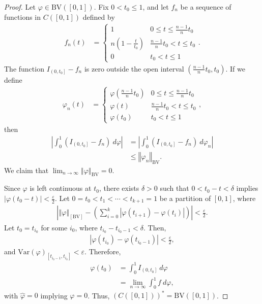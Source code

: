 \documentclass[10pt]{extarticle}
\newcommand{\norm}[1]{\left\Vert #1\right\Vert}
\newcommand{\ve}{\varepsilon}
\theoremstyle{plain}
\theoremstyle{definition}
\theoremstyle{note}
\renewcommand{\newline}{\hfill\break}
\begin{document}
\begin{proof}
  Let $\varphi \in \text{BV}\left([0,1]\right)$. Fix $0 < t_0 \leq 1$, and let $f_n$ be a sequence of functions in $C\left([0,1]\right)$ defined by
  \begin{align*}
    f_n\left(t\right) &= \begin{cases}
      1 & 0 \leq t \leq \frac{n-1}{n}t_0\\
      n\left(1 - \frac{t}{t_0}\right) & \frac{n-1}{n}t_0 < t \leq t_0\\
      0 & t_0 < t \leq 1
    \end{cases}.
  \end{align*}
  The function $I_{\left(0,t_0\right]} - f_n$ is zero outside the open interval $\left(\frac{n-1}{n}t_0,t_0\right)$. If we define
  \begin{align*}
    \varphi_n(t) &= \begin{cases}
      \varphi\left(\frac{n-1}{n}t_0\right) & 0 \leq t \leq \frac{n-1}{n}t_0\\
      \varphi(t) & \frac{n-1}{n}t_0 < t \leq t_0\\
      \varphi\left(t_0\right) & t_0 < t \leq 1
    \end{cases},
  \end{align*}
  then
  \begin{align*}
    \left\vert \int_{0}^{1} \left(I_{\left(0,t_0\right]} - f_n\right)\:d\varphi \right\vert &= \left\vert \int_{0}^{1} \left(I_{\left(0,t_0\right]} - f_n\right)\:d\varphi_n \right\vert\\
                                                                                            &\leq \norm{\varphi_n}_{\text{BV}}.
  \end{align*}
  We claim that $\lim_{n\rightarrow\infty}\norm{\varphi}_{\text{BV}} = 0$.\newline

  Since $\varphi$ is left continuous at $t_0$, there exists $\delta > 0$ such that $0 < t_0 - t < \delta$ implies $\left\vert \varphi(t_0 - t) \right\vert < \frac{\ve}{2}$. Let $0 = t_0 < t_1 < \cdots < t_{k+1} = 1$ be a partition of $[0,1]$, where
  \begin{align*}
    \left\vert\norm{\varphi}_[\text{BV}] - \left(\sum_{i=0}^{k}\left\vert \varphi(t_{i+1}) - \varphi(t_i) \right\vert\right)\right\vert < \frac{\ve}{2}.
  \end{align*}
  Let $t_0 = t_{i_0}$ for some $i_0$, where $t_{i_0} - t_{i_0 - 1} < \delta$. Then,
  \begin{align*}
    \left\vert \varphi\left(t_{i_0}\right) - \varphi\left(t_{i_0 - 1}\right) \right\vert < \frac{\ve}{2},
  \end{align*}
  and $\text{Var}\left(\varphi\right)_{\left[t_{i_0 - 1} ,t_{i_0}\right]} < \ve$. Therefore,
  \begin{align*}
    \varphi\left(t_0\right) &= \int_{0}^{1} I_{\left(0,t_0\right]}\:d\varphi\\
                            &= \lim_{n\rightarrow\infty}\int_{0}^{1} f\:d\varphi,
  \end{align*}
  with $\hat{\varphi} = 0$ implying $\varphi = 0$. Thus, $\left(C\left([0,1]\right)\right)^{\ast} = \text{BV}\left([0,1]\right)$.
\end{proof}
\end{document}
